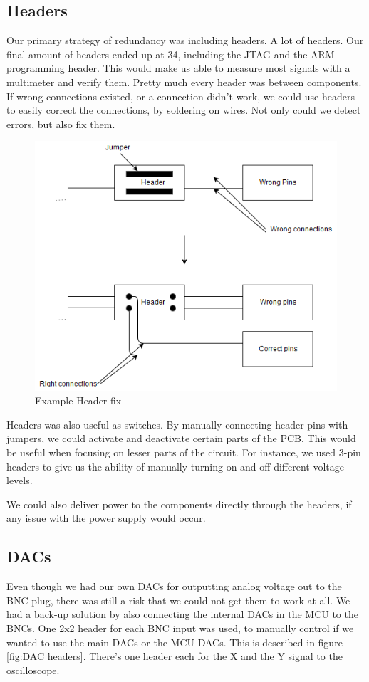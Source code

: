 \subsection{Headers}
Our primary strategy of redundancy was including headers. A lot of headers. Our final amount of headers ended up at 34, including the JTAG and the ARM programming header. This would make us able to measure most signals with a multimeter and verify them. 
\newline
Pretty much every header was between components. If wrong connections existed, or a connection didn't work, we could use headers to easily correct the connections, by soldering on wires. Not only could we detect errors, but also fix them.

\begin{figure}[h!]
\centering
\includegraphics[scale = 0.45]{images/Header_fix.png}
\caption{Example Header fix}
\label{fig:Header fix}
\end{figure}

Headers was also useful as switches. By manually connecting header pins with jumpers, we could activate and deactivate certain parts of the PCB. This would be useful when focusing on lesser parts of the circuit. For instance, we used 3-pin headers to give us the ability of manually turning on and off different voltage levels. 

We could also deliver power to the components directly through the headers, if any issue with the power supply would occur.

\subsection{DACs}
Even though we had our own DACs for outputting analog voltage out to the BNC plug, there was still a risk that we could not get them to work at all. We had a back-up solution by also connecting the internal DACs in the MCU to the BNCs. One 2x2 header for each BNC input was used, to manually control if we wanted to use the main DACs or the MCU DACs. This is described in figure \ref{fig:DAC headers}. There's one header each for the X and the Y signal to the oscilloscope. 

